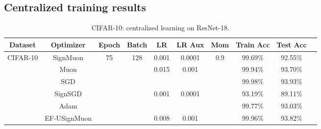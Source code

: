 \documentclass{article}
\begin{document}
\subsection{Centralized training results}\label{app:images_cen}
\begin{table}[H]
\centering
\caption{CIFAR-10: centralized learning on ResNet-18.}
\label{tab:cifar_central}
\small
\renewcommand{\arraystretch}{1.2}
\begin{tabular}{|c|c|c|c|c|c|c|c|c|c|}
\hline
\textbf{Dataset} & \textbf{Optimizer} & \textbf{Epoch} & \textbf{Batch} & \textbf{LR} & \textbf{LR Aux} & \textbf{Mom} & \textbf{Train Acc} & \textbf{Test Acc} \\
\hline
\multirow{6}{*}{CIFAR-10} & SignMuon & \multirow{6}{*}{75} & \multirow{6}{*}{128} & 0.001 & 0.0001 & \multirow{6}{*}{0.9} & 99.69\% & 92.55\% \\
\cline{2-2} \cline{5-6} \cline{8-9}
 & Muon & & & \multirow{2}{*}{0.015}  & \multirow{2}{*}{0.001} & & 99.94\% & 93.70\% \\
 \cline{2-2} \cline{8-9}
& SGD & & & & & & 99.98\% & 93.93\% \\
\cline{2-2} \cline{5-6} \cline{8-9}
& SignSGD & & & \multirow{2}{*}{0.001}  & \multirow{2}{*}{0.0001}  & & 93.19\% & 89.11\% \\
\cline{2-2} \cline{8-9}
 & Adam & & &  & & & 99.77\% & 93.03\% \\
 \cline{2-2} \cline{5-6} \cline{8-9}
 & EF-USignMuon & & & 0.008 & 0.001& & 99.96\% & 93.82\% \\
\hline
\end{tabular}
\end{table}

\end{document}
